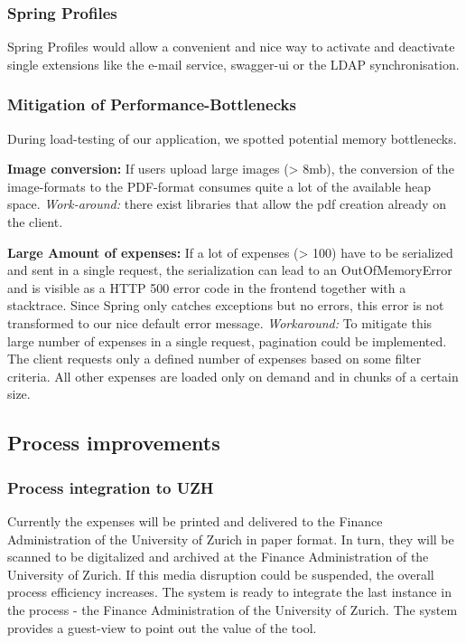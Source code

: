 \subsubsection{Spring Profiles}
Spring Profiles would allow a convenient and nice way to activate and deactivate single extensions like the e-mail service, swagger-ui or the LDAP synchronisation.

\subsubsection{Mitigation of Performance-Bottlenecks}
During load-testing of our application, we spotted potential memory bottlenecks. 

\textbf{Image conversion:} If users upload large images (> 8mb), the conversion of the image-formats to the PDF-format consumes quite a lot of the available heap space. \textit{Work-around:} there exist libraries that allow the pdf creation already on the client.\par 
 	
\textbf{Large Amount of expenses:} If a lot of expenses (> 100) have to be serialized and sent in a single request, the serialization can lead to an OutOfMemoryError and is visible as a HTTP 500 error code in the frontend together with a stacktrace. Since Spring only catches exceptions but no errors, this error is not transformed to our nice default error message. \textit{Workaround: } To mitigate this large number of expenses in a single request, pagination could be implemented. The client requests only a defined number of expenses based on some filter criteria. All other expenses are loaded only on demand and in chunks of a certain size.


\subsection{Process improvements}
\subsubsection{Process integration to UZH}
Currently the expenses will be printed and delivered to the Finance Administration of the University of Zurich in paper format. In turn, they will be scanned to be digitalized and archived at the Finance Administration of the University of Zurich. If this media disruption could be suspended, the overall process efficiency increases. The system is ready to integrate the last instance in the process - the Finance Administration of the University of Zurich. The system provides a guest-view to point out the value of the tool.\par

